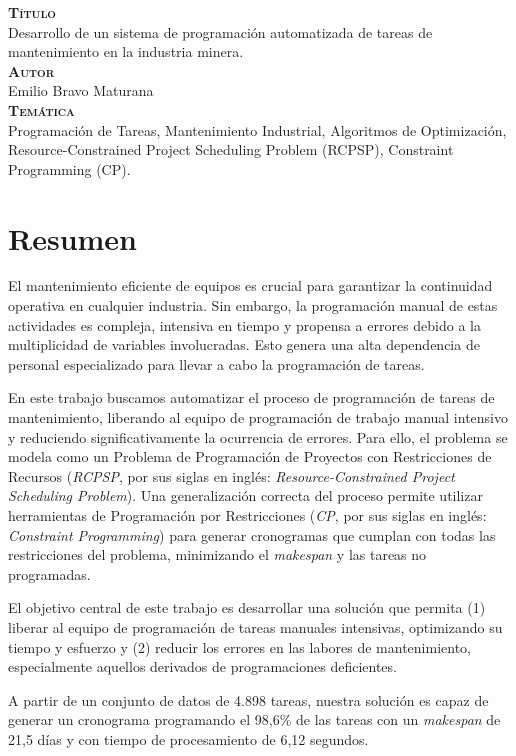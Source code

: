 \documentclass{article}
\begin{document}
{\bfseries\scshape Título}\\[.25cm]
Desarrollo de un sistema de programación automatizada de tareas de mantenimiento en la industria minera.\\


{\bfseries\scshape Autor}\\[.25cm]
Emilio Bravo Maturana\\

{\bfseries\scshape Temática}\\[.25cm]
Programación de Tareas, Mantenimiento Industrial, Algoritmos de Optimización, Resource-Constrained Project Scheduling Problem (RCPSP), Constraint Programming (CP).

\newpage

\section*{Resumen}
El mantenimiento eficiente de equipos es crucial para garantizar la continuidad operativa en cualquier industria. Sin embargo, la programación manual de estas actividades es compleja, intensiva en tiempo y propensa a errores debido a la multiplicidad de variables involucradas. Esto genera una alta dependencia de personal especializado para llevar a cabo la programación de tareas.

En este trabajo buscamos automatizar el proceso de programación de tareas de mantenimiento, liberando al equipo de programación de trabajo manual intensivo y reduciendo significativamente la ocurrencia de errores. Para ello, el problema se modela como un Problema de Programación de Proyectos con Restricciones de Recursos (\textit{RCPSP}, por sus siglas en inglés: \textit{Resource-Constrained Project Scheduling Problem}). Una generalización correcta del proceso permite utilizar herramientas de Programación por Restricciones (\textit{CP}, por sus siglas en inglés: \textit{Constraint Programming}) para generar cronogramas que cumplan con todas las restricciones del problema, minimizando el \textit{makespan} y las tareas no programadas.

El objetivo central de este trabajo es desarrollar una solución que permita (1) liberar al equipo de programación de tareas manuales intensivas, optimizando su tiempo y esfuerzo y (2) reducir los errores en las labores de mantenimiento, especialmente aquellos derivados de programaciones deficientes.

A partir de un conjunto de datos de 4.898 tareas, nuestra solución es capaz de generar un cronograma programando el 98,6\% de las tareas con un \textit{makespan} de 21,5 días y con tiempo de procesamiento de 6,12 segundos.
\newpage
\end{document}
